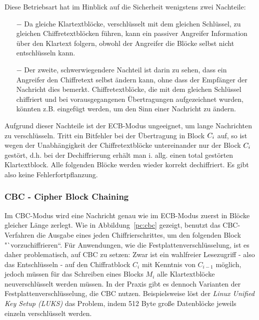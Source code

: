 Diese Betriebsart hat im Hinblick auf die Sicherheit wenigstens zwei Nachteile:

\begin{itemize}
  \item[$-$] Da gleiche Klartextblöcke, verschlüsselt mit dem gleichen Schlüssel, zu gleichen Chiffretextblöcken führen, kann ein passiver Angreifer
  Information über den Klartext folgern, obwohl der Angreifer die Blöcke selbst nicht entschlüsseln kann.
  \item[$-$] Der zweite, schwerwiegendere Nachteil ist darin zu sehen, dass ein Angreifer den Chiffretext selbst ändern kann, ohne dass der Empfänger der
  Nachricht dies bemerkt. Chiffretextblöcke, die mit dem gleichen Schlüssel chiffriert und bei vorausgegangenen Übertragungen aufgezeichnet wurden, könnten
  z.B. eingefügt werden, um den Sinn einer Nachricht zu ändern.
\end{itemize}

Aufgrund dieser Nachteile ist der ECB-Modus ungeeignet, um lange Nachrichten zu verschlüsseln. Tritt ein Bitfehler bei der Übertragung in Block $C_i$ auf, so ist wegen der Unabhängigkeit der Chiffretextblöcke untereinander nur der Block
$C_i$ gestört, d.h. bei der Dechiffrierung erhält man i. allg. einen total gestörten Klartextblock. Alle folgenden Blöcke werden wieder korrekt
dechiffriert. Es gibt also keine Fehlerfortpflanzung.

\subsubsection{CBC - Cipher Block Chaining}
\label{cbc}

Im CBC-Modus wird eine Nachricht genau wie im ECB-Modus zuerst in Blöcke gleicher Länge zerlegt. Wie in Abbildung~\ref{pc:cbc} gezeigt, benutzt das CBC-Verfahren die Ausgabe eines jeden Chiffrierschrittes, um den folgenden Block "`vorzuchiffrieren``.
Für Anwendungen, wie die Festplattenverschlüsselung, ist es daher problematisch, auf CBC zu setzen: Zwar ist ein wahlfreier Lesezugriff - also das Entschlüsseln - auf den Chiffratblock $C_i$ mit Kenntnis von $C_{i-1}$ möglich, jedoch müssen für das Schreiben eines Blocks $M_i$ alle Klartextblöcke neuverschlüsselt werden müssen. In der Praxis gibt es dennoch Varianten der Festplattenverschlüsselung, die CBC nutzen.
Beispielsweise löst der \textit{Linux Unified Key Setup (LUKS)} das Problem, indem 512 Byte große Datenblöcke jeweils einzeln verschlüsselt werden.

